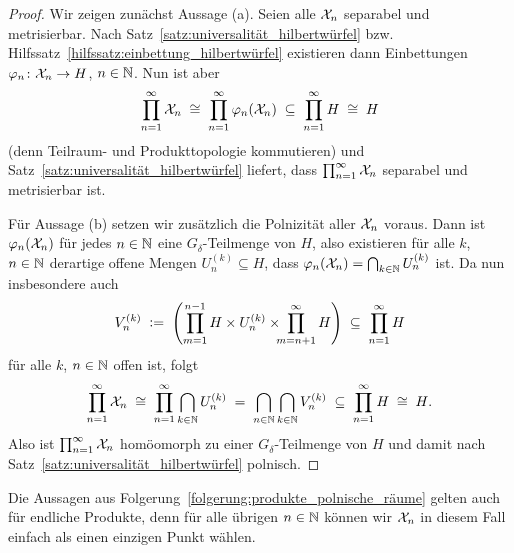 \documentclass[../thesis/thesis.tex]{subfiles}
\begin{document}
	\begin{proof}
		Wir zeigen zunächst Aussage (a). Seien alle $\mathcal{X}_n$ separabel und metrisierbar. Nach Satz~\ref{satz:universalität_hilbertwürfel} bzw. 
		Hilfssatz~\ref{hilfssatz:einbettung_hilbertwürfel} existieren dann Einbettungen $\varphi_n \colon \mathcal{X}_n \to H$, $n \in \mathbb{N}$. Nun ist aber 
		\[ \prod_{n=1}^{\infty} \mathcal{X}_n \; \cong \; \prod_{n=1}^{\infty} \varphi_n(\mathcal{X}_n) \; \subseteq \; \prod_{n=1}^{\infty} H \; \cong \; H \]
		(denn Teilraum- und Produkttopologie kommutieren) und Satz~\ref{satz:universalität_hilbertwürfel} liefert, dass $\prod_{n=1}^{\infty} \mathcal{X}_n$ separabel und metrisierbar ist.
		
		Für Aussage (b) setzen wir zusätzlich die Polnizität aller $\mathcal{X}_n$ voraus. Dann ist $\varphi_n(\mathcal{X}_n)$ für jedes $n \in \mathbb{N}$ eine $G_{\delta}$-Teilmenge von $H$, also
		existieren für alle $k$, $n \in \mathbb{N}$ derartige offene Mengen $U_n^{(k)} \subseteq H$, dass $\varphi_n(\mathcal{X}_n) = \bigcap_{k \in \mathbb{N}} U_n^{(k)}$ ist. Da nun insbesondere auch
		\[ V_n^{(k)} \; \vcentcolon = \; \left( \prod_{m=1}^{n-1} H \times U_n^{(k)} \times \!\!\! \prod_{m=n+1}^{\infty} H \right) \; \subseteq \; \prod_{n=1}^{\infty} H \]
		für alle $k$, $n \in \mathbb{N}$ offen ist, folgt
		\[ \prod_{n=1}^{\infty} \mathcal{X}_n \; \cong \; \prod_{n=1}^{\infty} \bigcap_{k \in \mathbb{N}} U_n^{(k)} \; = \; \bigcap_{n \in \mathbb{N}} \bigcap_{k \in \mathbb{N}} V_n^{(k)} \; \subseteq \; \prod_{n=1}^{\infty} H \; \cong \; H \text{.} \]
		Also ist $\prod_{n=1}^{\infty} \mathcal{X}_n$ homöomorph zu einer $G_{\delta}$-Teilmenge von $H$ und damit nach Satz~\ref{satz:universalität_hilbertwürfel} polnisch.
	\end{proof}
	
	\begin{Bemerkung}
		Die Aussagen aus Folgerung~\ref{folgerung:produkte_polnische_räume} gelten auch für endliche Produkte, denn für alle übrigen $n \in \mathbb{N}$ können wir $\mathcal{X}_n$ in diesem Fall einfach als einen einzigen Punkt wählen.
	\end{Bemerkung}
	
\end{document}
